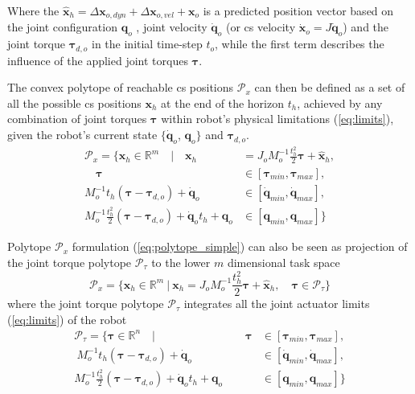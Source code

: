 Where the $\hat{\bm{x}}_{h}\! =\!\Delta \bm{x}_{o,dyn}\! +\! \Delta \bm{x}_{o,vel} + \bm{x}_{o}$ is a predicted position vector based on the joint configuration $\bm{q}_o$ , joint velocity $\dot{\bm{q}}_o$ (or \gls{cs} velocity  $\dot{\bm{x}}_o\!=\!J\dot{\bm{q}}_o$) and the joint torque $\bm{\tau}_{d,o}$ in the initial time-step $t_o$, while the first term describes the influence of the applied joint torques $\bm{\tau}$.

The convex polytope of reachable \gls{cs} positions $\mathcal{P}_x$ can then be defined as a set of all the possible \gls{cs} positions $\bm{x}_{h}$ at the end of the horizon $t_h$, achieved by any combination of joint torques $\bm{\tau}$ within robot's physical limitations (\ref{eq:limits}), given the robot's current state $\{\dot{\bm{q}}_o$, $\bm{q}_o\}$ and $\bm{\tau}_{d,o}$.
\begin{equation}
\begin{split}
    \mathcal{P}_x= \{ \bm{x}_{h} \in \mathbb{R}^m \quad| \quad \bm{x}_{h} &= J_o M_o^{-1}\frac{t_h^2}{2}\bm{\tau} + \hat{\bm{x}}_{h},\\
    \quad \bm{\tau} &\in \left[\bm{\tau}_{min},\bm{\tau}_{max}\right],\\
   M_o^{-1}t_h (\bm{\tau} - \bm{\tau}_{d,o}) + \dot{\bm{q}}_o &\in \left[\dot{\bm{q}}_{min},\dot{\bm{q}}_{max}\right],\\
   M_o^{-1}\frac{t_h^2}{2}(\bm{\tau} - \bm{\tau}_{d,o}) +  \dot{\bm{q}}_ot_h + \bm{q}_o &\in \left[\bm{q}_{min},\bm{q}_{max}\right] \}
\end{split} 
\label{eq:polytope_simple}
\end{equation}

Polytope $\mathcal{P}_x$ formulation (\ref{eq:polytope_simple}) can also be seen as projection of the joint torque polytope $\mathcal{P}_\tau$ to the lower $m$ dimensional task space
\begin{equation}
    \mathcal{P}_x= \{ \bm{x}_{h} \in \mathbb{R}^m ~| ~ \bm{x}_{h} = J_o M_o^{-1}\frac{t_h^2}{2}\bm{\tau} + \hat{\bm{x}}_{h},\quad \bm{\tau}\in\mathcal{P}_\tau\}
\end{equation}
where the joint torque polytope $\mathcal{P}_\tau$ integrates all the joint actuator limits (\ref{eq:limits}) of the robot
\begin{equation}
\begin{split}
    \mathcal{P}_\tau= \{ \bm{\tau} \in \mathbb{R}^n \quad|\qquad\qquad\qquad\qquad \bm{\tau} &\in \left[\bm{\tau}_{min},\bm{\tau}_{max}\right],\\~
   M_o^{-1}t_h (\bm{\tau} - \bm{\tau}_{d,o}) + \dot{\bm{q}}_o &\in \left[\dot{\bm{q}}_{min},\dot{\bm{q}}_{max}\right],\\
   M_o^{-1}\frac{t_h^2}{2}(\bm{\tau} - \bm{\tau}_{d,o}) +  \dot{\bm{q}}_ot_h + \bm{q}_o &\in \left[\bm{q}_{min},\bm{q}_{max}\right] \}
\end{split} 
\label{eq:torqe_poly_rs}
\end{equation}

